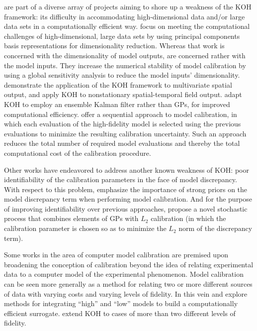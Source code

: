 \documentclass[12pt]{article}
\begin{document}
\citet{Paulo2012} are part of a diverse array of projects aiming to shore up a weakness of the KOH framework: its difficulty in accommodating high-dimensional data and/or large data sets in a computationally efficient way.
\citet{Higdon2008a} focus on meeting the computational challenges of high-dimensional, large data sets by using principal components basis representations for dimensionality reduction.
Whereas that work is concerned with the dimensionality of model outputs, \citet{Drignei2012} are concerned rather with the model inputs.
They increase the numerical stability of model calibration by using a global sensitivity analysis to reduce the model inputs' dimensionality.
\citet{Bhat2010} demonstrate the application of the KOH framework to multivariate spatial output, and \citet{Pratola2013} apply KOH to nonstationary spatial-temporal field output.
\citet{Higdon2013} adapt KOH to employ an ensemble Kalman filter rather than GPs, for improved computational efficiency.
\citet{Yuan2013} offer a sequential approach to model calibration, in which each evaluation of the high-fidelity model is selected using the previous evaluations to minimize the resulting calibration uncertainty. 
Such an approach reduces the total number of required model evaluations and thereby the total computational cost of the calibration procedure.

Other works have endeavored to address another known weakness of KOH: poor identifiability of the calibration parameters in the face of model discrepancy.
With respect to this problem, \citet{Brynjarsdottir2014} emphasize the importance of strong priors on the model discrepancy term when performing model calibration.
And for the purpose of improving identifiability over previous approaches, \citet{Gu2018} propose a novel stochastic process that combines elements of GPs with $L_2$ calibration (in which the calibration parameter is chosen so as to minimize the $L_2$ norm of the discrepancy term).

Some works in the area of computer model calibration are premised upon broadening the conception of calibration beyond the idea of relating experimental data to a computer model of the experimental phenomenon.
Model calibration can be seen more generally as a method for relating two or more different sources of data with varying costs and varying levels of fidelity.
In this vein \citet{Kennedy2000} and \citet{Qian2006} explore methods for integrating ``high'' and ``low'' models to build a computationally efficient surrogate.
\citet{Goh2013} extend KOH to cases of more than two different levels of fidelity.
\end{document}
